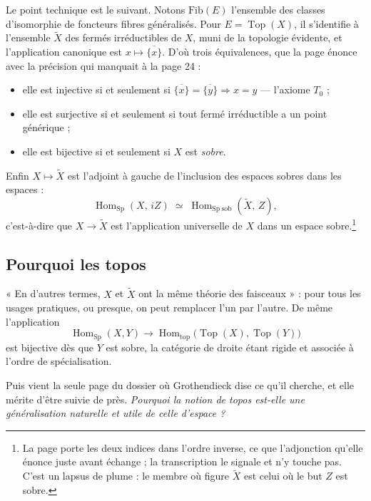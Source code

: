 \documentclass[11pt,a4paper]{article}
\begin{document}
Le point technique est le suivant. Notons $\mathrm{Fib}(E)$ l'ensemble des
classes d'isomorphie de foncteurs fibres généralisés. Pour
$E = \operatorname{Top}(X)$, il s'identifie à l'ensemble $\widetilde{X}$ des
fermés irréductibles de $X$, muni de la topologie évidente, et l'application
canonique est $x \mapsto \overline{\{x\}}$. D'où trois équivalences, que la page
énonce avec la précision qui manquait à la page 24 :

\begin{itemize}
\item elle est injective si et seulement si $\overline{\{x\}} =
\overline{\{y\}} \Rightarrow x = y$ — l'axiome $T_{0}$ ;
\item elle est surjective si et seulement si tout fermé irréductible a un point
générique ;
\item elle est bijective si et seulement si $X$ est \emph{sobre}.
\end{itemize}

Enfin $X \mapsto \widetilde{X}$ est l'adjoint à gauche de l'inclusion des
espaces sobres dans les espaces :
\[
\operatorname{Hom}_{\mathrm{Sp}}(X,\, i Z) \;\simeq\;
\operatorname{Hom}_{\mathrm{Sp\ sob}}(\widetilde{X},\, Z),
\]
c'est-à-dire que $X \to \widetilde{X}$ est l'application universelle de $X$
dans un espace sobre.\footnote{La page porte les deux indices dans l'ordre
inverse, ce que l'adjonction qu'elle énonce juste avant échange ; la
transcription le signale et n'y touche pas. C'est un lapsus de plume : le
membre où figure $\widetilde{X}$ est celui où le but $Z$ est sobre.}

\subsection*{Pourquoi les topos}

« En d'autres termes, $X$ et $\widetilde{X}$ ont la même théorie des
faisceaux » : pour tous les usages pratiques, ou presque, on peut remplacer
l'un par l'autre. De même l'application
\[
\operatorname{Hom}_{\mathrm{Sp}}(X, Y) \longrightarrow
\operatorname{Hom}_{\mathrm{top}}\bigl(\operatorname{Top}(X),
\operatorname{Top}(Y)\bigr)
\]
est bijective dès que $Y$ est sobre, la catégorie de droite étant rigide et
associée à l'ordre de spécialisation.

Puis vient la seule page du dossier où Grothendieck dise ce qu'il cherche, et
elle mérite d'être suivie de près. \emph{Pourquoi la notion de topos est-elle
une généralisation naturelle et utile de celle d'espace ?}
\end{document}
